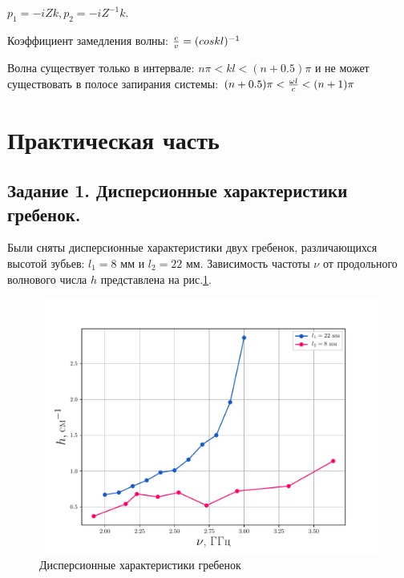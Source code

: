  $p_1=-iZk, p_2=-iZ^{-1}k$.


Коэффициент замедления волны: ${{c}\over{v}}=(coskl)^{-1}$


Волна существует только в интервале: $n\pi <kl<(n+0.5)\pi$
и не может существовать в полосе запирания системы: $(n+0.5)\pi <{{\omega l}\over{c}}<(n+1)\pi$




\section{Практическая часть} %
\subsection*{Задание 1. Дисперсионные характеристики гребенок.} %
Были сняты дисперсионные характеристики двух гребенок, различающихся высотой зубьев: $l_1 = 8$ мм и $l_2 = 22 $ мм.
Зависимость частоты  $\nu$ от продольного волнового числа  $h$ представлена на рис.\ref{fig:1}.
\begin{figure}[h!]
\centering
\includegraphics[width=0.9\linewidth]{rec/task1.pdf}
\caption{Дисперсионные характеристики гребенок}
\label{fig:1}
\end{figure}

